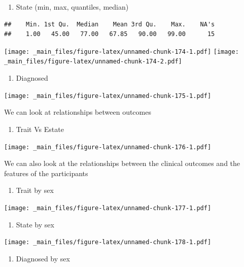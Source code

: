 \documentclass[
]{book}
\providecommand{\tightlist}{%
  \setlength{\itemsep}{0pt}\setlength{\parskip}{0pt}}
\begin{document}
\begin{enumerate}
\def\labelenumi{\alph{enumi}.}
\setcounter{enumi}{1}
\tightlist
\item
  State (min, max, quantiles, median)
\end{enumerate}

\begin{verbatim}
##    Min. 1st Qu.  Median    Mean 3rd Qu.    Max.    NA's 
##    1.00   45.00   77.00   67.85   90.00   99.00      15
\end{verbatim}

\texttt{[image: \_main\_files/figure-latex/unnamed-chunk-174-1.pdf]} \texttt{[image: \_main\_files/figure-latex/unnamed-chunk-174-2.pdf]}

\begin{enumerate}
\def\labelenumi{\alph{enumi}.}
\setcounter{enumi}{2}
\tightlist
\item
  Diagnosed
\end{enumerate}

\texttt{[image: \_main\_files/figure-latex/unnamed-chunk-175-1.pdf]}

We can look at relationships between outcomes

\begin{enumerate}
\def\labelenumi{\alph{enumi}.}
\setcounter{enumi}{3}
\tightlist
\item
  Trait Vs Estate
\end{enumerate}

\texttt{[image: \_main\_files/figure-latex/unnamed-chunk-176-1.pdf]}

We can also look at the relationships between the clinical outcomes and the features of the participants

\begin{enumerate}
\def\labelenumi{\alph{enumi}.}
\setcounter{enumi}{4}
\tightlist
\item
  Trait by sex
\end{enumerate}

\texttt{[image: \_main\_files/figure-latex/unnamed-chunk-177-1.pdf]}

\begin{enumerate}
\def\labelenumi{\alph{enumi}.}
\setcounter{enumi}{5}
\tightlist
\item
  State by sex
\end{enumerate}

\texttt{[image: \_main\_files/figure-latex/unnamed-chunk-178-1.pdf]}

\begin{enumerate}
\def\labelenumi{\alph{enumi}.}
\setcounter{enumi}{6}
\tightlist
\item
  Diagnosed by sex
\end{enumerate}
\end{document}
